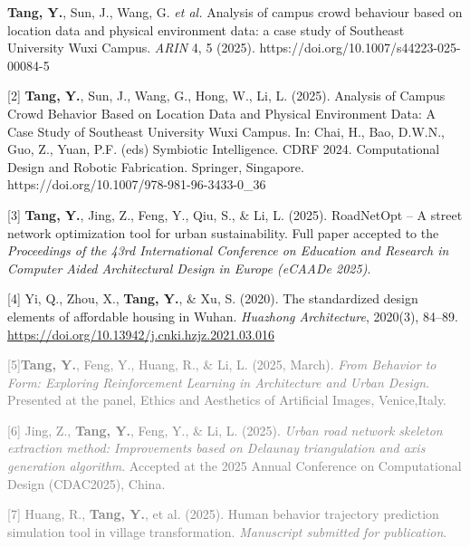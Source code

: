 \documentclass[10pt, letterpaper]{article}
\begin{document}
            
    \begin{samepage}
          [1] \textbf{Tang, Y.}, Sun, J., Wang, G. \textit{et al.} Analysis of campus crowd behaviour based on location data and physical environment data: a case study of Southeast University Wuxi Campus. \textit{ARIN} 4, 5 (2025). https://doi.org/10.1007/s44223-025-00084-5 
        \vspace{0.5em}
        
    
          [2] \textbf{Tang, Y.}, Sun, J., Wang, G., Hong, W., Li, L. (2025). Analysis of Campus Crowd Behavior Based on Location Data and Physical Environment Data: A Case Study of Southeast University Wuxi Campus. In: Chai, H., Bao, D.W.N., Guo, Z., Yuan, P.F. (eds) Symbiotic Intelligence. CDRF 2024. Computational Design and Robotic Fabrication. Springer, Singapore. https://doi.org/10.1007/978-981-96-3433-0\_36 
        \vspace{0.5em}
        
    
        [3]\textbf{ Tang, Y.}, Jing, Z., Feng, Y., Qiu, S., \& Li, L. (2025). RoadNetOpt – A street network optimization tool for urban sustainability. Full paper accepted to the \textit{Proceedings of the 43rd International Conference on Education and Research in Computer Aided Architectural Design in Europe (eCAADe 2025)}.
        \vspace{0.5em}
        
    
        [4] Yi, Q., Zhou, X., \textbf{Tang, Y.}, \& Xu, S. (2020). The standardized design elements of affordable housing in Wuhan. \textit{Huazhong Architecture}, 2020(3), 84–89. \href{https://doi.org/10.13942/j.cnki.hzjz.2021.03.016}{https://doi.org/10.13942/j.cnki.hzjz.2021.03.016}
        \vspace{0.5em}
        
    
        \textcolor{gray} {[5]\textbf{Tang, Y.}, Feng, Y., Huang, R., \& Li, L. (2025, March). \textit{From Behavior to Form: Exploring Reinforcement Learning in Architecture and Urban Design}. Presented at the panel, Ethics and Aesthetics of Artificial Images, Venice,Italy.}
        \vspace{0.5em}
        
    
        \textcolor{gray} {[6] Jing, Z., \textbf{Tang, Y.}, Feng, Y., \& Li, L. (2025). \textit{Urban road network skeleton extraction method: Improvements based on Delaunay triangulation and axis generation algorithm}. Accepted at the 2025 Annual Conference on Computational Design (CDAC2025), China.}
        \vspace{0.5em}
        
    
        \textcolor{gray} {[7] Huang, R., \textbf{Tang, Y.}, et al. (2025). Human behavior trajectory prediction simulation tool in village transformation. \textit{Manuscript submitted for publication}.}
        \vspace{0.5em}
        
    
        
    
        
    
        \end{samepage}
    
\end{document}
